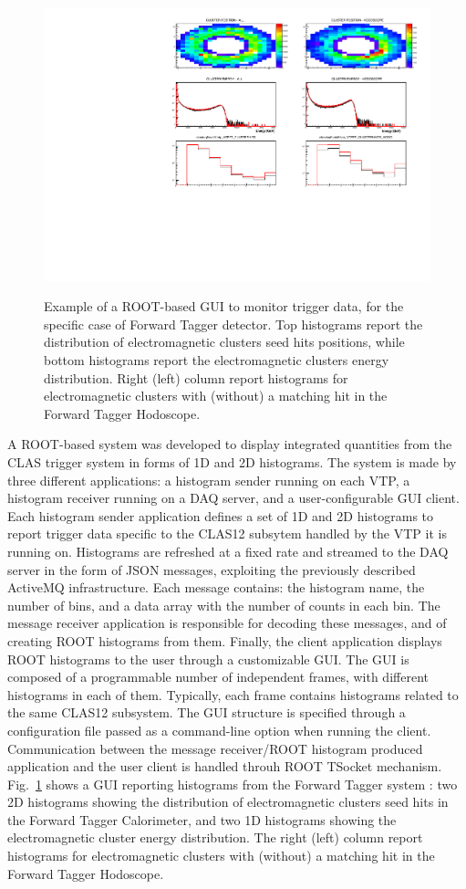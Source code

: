 \begin{figure}[t]
  \includegraphics[width=\textwidth]{img/plotAndrea.pdf}
  \label{fig:plotAndrea}
  \caption{Example of a ROOT-based GUI to monitor trigger data, for the specific case of Forward Tagger detector. Top histograms report the distribution of electromagnetic clusters seed hits positions, while bottom histograms report the electromagnetic clusters energy distribution. Right (left) column report histograms for electromagnetic clusters  with (without) a matching hit in the Forward Tagger Hodoscope.}
\end{figure}

A ROOT-based system was developed to display integrated quantities from the CLAS trigger system in forms of 1D and 2D histograms. The system is made by three different applications: a histogram sender running on each VTP, a histogram receiver running on a DAQ server, and a user-configurable GUI client.
Each histogram sender application defines a set of 1D and 2D histograms to report trigger data specific to the CLAS12 subsytem handled by the VTP it is running on. Histograms are refreshed at a fixed rate and streamed to the DAQ server in the form of JSON messages, exploiting the previously described ActiveMQ infrastructure. Each message contains: the histogram name, the number of bins, and a data array with the number of counts in each bin.
The message receiver application is responsible for decoding these messages, and of creating ROOT histograms from them. Finally, the client application displays ROOT histograms to the user through a customizable GUI. The GUI is composed of a programmable number of independent frames, with different histograms in each of them. Typically, each frame contains histograms related to the same CLAS12 subsystem. The GUI structure is specified through a configuration file passed as a command-line option when running the client. Communication between the message receiver/ROOT histogram produced application and the user client is handled throuh ROOT TSocket mechanism.
Fig.~\ref{fig:plotAndrea} shows a GUI reporting histograms from the Forward Tagger system \cite{ft-ref}: two 2D histograms showing the distribution of electromagnetic clusters seed hits in the Forward Tagger Calorimeter, and two 1D histograms showing the electromagnetic cluster energy distribution. The right (left) column report histograms for electromagnetic clusters  with (without) a matching hit in the Forward Tagger Hodoscope.
